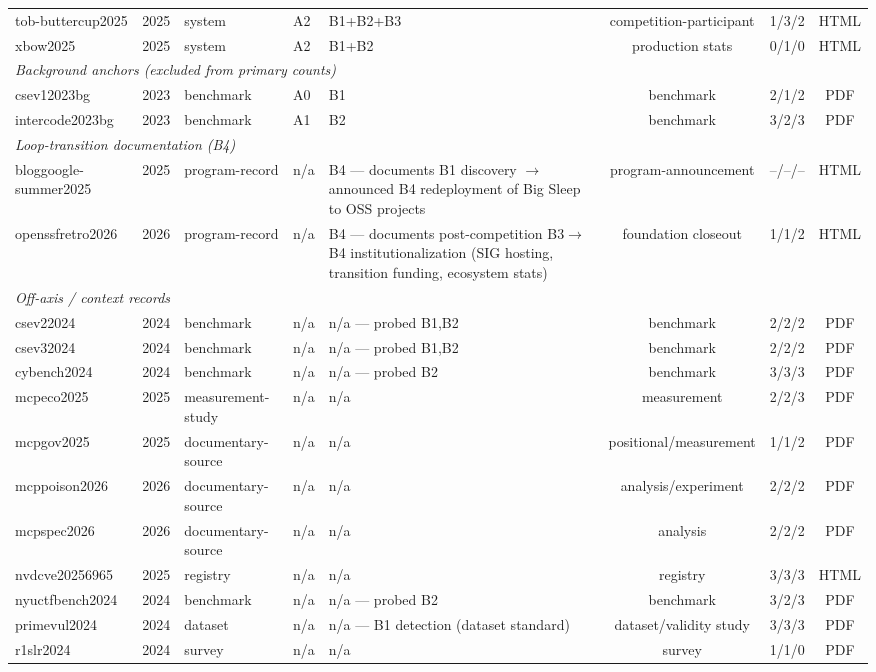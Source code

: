 \documentclass[conference,compsoc]{IEEEtran}
\begin{document}
\begin{table}[t]
{\begin{tabular}{lllllccc}
tob-buttercup2025 & 2025 & system & A2 & B1+B2+B3 & competition-participant & 1/3/2 & HTML\\
xbow2025 & 2025 & system & A2 & B1+B2 & production stats & 0/1/0 & HTML\\
\midrule
\multicolumn{8}{l}{\emph{Background anchors (excluded from primary counts)}}\\
csev12023bg & 2023 & benchmark & A0 & B1 & benchmark & 2/1/2 & PDF\\
intercode2023bg & 2023 & benchmark & A1 & B2 & benchmark & 3/2/3 & PDF\\
\midrule
\multicolumn{8}{l}{\emph{Loop-transition documentation (B4)}}\\
bloggoogle-summer2025 & 2025 & program-record & n/a & B4 — documents B1 discovery $\to$ announced B4 redeployment of Big Sleep to OSS projects & program-announcement & --/--/-- & HTML\\
openssfretro2026 & 2026 & program-record & n/a & B4 — documents post-competition B3$\to$B4 institutionalization (SIG hosting, transition funding, ecosystem stats) & foundation closeout & 1/1/2 & HTML\\
\midrule
\multicolumn{8}{l}{\emph{Off-axis / context records}}\\
csev22024 & 2024 & benchmark & n/a & n/a — probed {B1,B2} & benchmark & 2/2/2 & PDF\\
csev32024 & 2024 & benchmark & n/a & n/a — probed {B1,B2} & benchmark & 2/2/2 & PDF\\
cybench2024 & 2024 & benchmark & n/a & n/a — probed {B2} & benchmark & 3/3/3 & PDF\\
mcpeco2025 & 2025 & measurement-study & n/a & n/a & measurement & 2/2/3 & PDF\\
mcpgov2025 & 2025 & documentary-source & n/a & n/a & positional/measurement & 1/1/2 & PDF\\
mcppoison2026 & 2026 & documentary-source & n/a & n/a & analysis/experiment & 2/2/2 & PDF\\
mcpspec2026 & 2026 & documentary-source & n/a & n/a & analysis & 2/2/2 & PDF\\
nvdcve20256965 & 2025 & registry & n/a & n/a & registry & 3/3/3 & HTML\\
nyuctfbench2024 & 2024 & benchmark & n/a & n/a — probed {B2} & benchmark & 3/2/3 & PDF\\
primevul2024 & 2024 & dataset & n/a & n/a — B1 detection (dataset standard) & dataset/validity study & 3/3/3 & PDF\\
r1slr2024 & 2024 & survey & n/a & n/a & survey & 1/1/0 & PDF\\

\end{tabular}}
\end{table}
\end{document}
